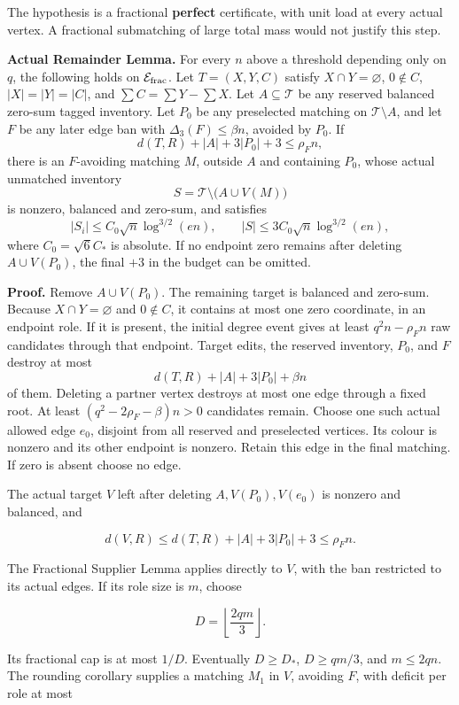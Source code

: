 \documentclass[11pt,a4paper]{article}
\newcommand{\statementstart}{\par\addvspace{6pt plus 1pt minus 1pt}\noindent}
\newcommand{\labelledparagraphstart}{\par\addvspace{3pt plus 1pt minus 1pt}\noindent}
\begin{document}
The hypothesis is a fractional \textbf{perfect} certificate, with unit load at every actual vertex. A fractional submatching of large total mass would not justify this step.

\statementstart\textbf{Actual Remainder Lemma.} For every \(n\) above a threshold depending only on \(q\), the following holds on \(\mathcal E_{\rm frac}\). Let \(T=(X,Y,C)\) satisfy \(X\cap Y=\varnothing\), \(0\notin C\), \(|X|=|Y|=|C|\), and \(\sum C=\sum Y-\sum X\). Let \(A\subseteq\mathcal T\) be any reserved balanced zero-sum tagged inventory. Let \(P_0\) be any preselected matching on \(\mathcal T\setminus A\), and let \(F\) be any later edge ban with \(\Delta_3(F)\le\beta n\), avoided by \(P_0\). If \[
d(T,R)+|A|+3|P_0|+3\le\rho_F n,
\] there is an \(F\)-avoiding matching \(M\), outside \(A\) and containing \(P_0\), whose actual unmatched inventory \[
S=\mathcal T\setminus\bigl(A\cup V(M)\bigr)
\] is nonzero, balanced and zero-sum, and satisfies \[
|S_i|\le C_0\sqrt n\log^{3/2}(en),\qquad
|S|\le3C_0\sqrt n\log^{3/2}(en),
\] where \(C_0=\sqrt6 C_*\) is absolute. If no endpoint zero remains after deleting \(A\cup V(P_0)\), the final \(+3\) in the budget can be omitted.

\labelledparagraphstart\textbf{Proof.} Remove \(A\cup V(P_0)\). The remaining target is balanced and zero-sum. Because \(X\cap Y=\varnothing\) and \(0\notin C\), it contains at most one zero coordinate, in an endpoint role. If it is present, the initial degree event gives at least \(q^2n-\rho_F n\) raw candidates through that endpoint. Target edits, the reserved inventory, \(P_0\), and \(F\) destroy at most \[
d(T,R)+|A|+3|P_0|+\beta n
\] of them. Deleting a partner vertex destroys at most one edge through a fixed root. At least \((q^2-2\rho_F-\beta)n>0\) candidates remain. Choose one such actual allowed edge \(e_0\), disjoint from all reserved and preselected vertices. Its colour is nonzero and its other endpoint is nonzero. Retain this edge in the final matching. If zero is absent choose no edge.

The actual target \(V\) left after deleting \(A,V(P_0),V(e_0)\) is nonzero and balanced, and

\[
d(V,R)\le d(T,R)+|A|+3|P_0|+3\le\rho_F n.
\]

The Fractional Supplier Lemma applies directly to \(V\), with the ban restricted to its actual edges. If its role size is \(m\), choose

\[
D=\left\lfloor\frac{2qm}{3}\right\rfloor.
\]

Its fractional cap is at most \(1/D\). Eventually \(D\ge D_*\), \(D\ge qm/3\), and \(m\le2qn\). The rounding corollary supplies a matching \(M_1\) in \(V\), avoiding \(F\), with deficit per role at most
\end{document}
